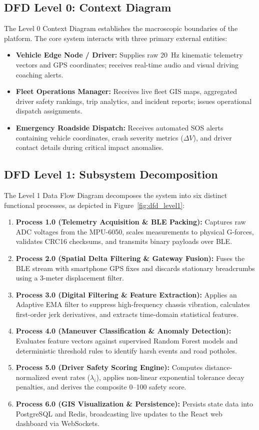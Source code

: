 \subsection{DFD Level 0: Context Diagram}
The Level 0 Context Diagram establishes the macroscopic boundaries of the platform. The core system interacts with three primary external entities:
\begin{itemize}
    \item \textbf{Vehicle Edge Node / Driver:} Supplies raw 20~Hz kinematic telemetry vectors and GPS coordinates; receives real-time audio and visual driving coaching alerts.
    \item \textbf{Fleet Operations Manager:} Receives live fleet GIS maps, aggregated driver safety rankings, trip analytics, and incident reports; issues operational dispatch assignments.
    \item \textbf{Emergency Roadside Dispatch:} Receives automated SOS alerts containing vehicle coordinates, crash severity metrics ($\Delta V$), and driver contact details during critical impact anomalies.
\end{itemize}

\subsection{DFD Level 1: Subsystem Decomposition}
The Level 1 Data Flow Diagram decomposes the system into six distinct functional processes, as depicted in Figure~\ref{fig:dfd_level1}:
\begin{enumerate}
    \item \textbf{Process 1.0 (Telemetry Acquisition \& BLE Packing):} Captures raw ADC voltages from the MPU-6050, scales measurements to physical G-forces, validates CRC16 checksums, and transmits binary payloads over BLE.
    \item \textbf{Process 2.0 (Spatial Delta Filtering \& Gateway Fusion):} Fuses the BLE stream with smartphone GPS fixes and discards stationary breadcrumbs using a 3-meter displacement filter.
    \item \textbf{Process 3.0 (Digital Filtering \& Feature Extraction):} Applies an Adaptive EMA filter to suppress high-frequency chassis vibration, calculates first-order jerk derivatives, and extracts time-domain statistical features.
    \item \textbf{Process 4.0 (Maneuver Classification \& Anomaly Detection):} Evaluates feature vectors against supervised Random Forest models and deterministic threshold rules to identify harsh events and road potholes.
    \item \textbf{Process 5.0 (Driver Safety Scoring Engine):} Computes distance-normalized event rates ($\lambda_i$), applies non-linear exponential tolerance decay penalties, and derives the composite 0--100 safety score.
    \item \textbf{Process 6.0 (GIS Visualization \& Persistence):} Persists state data into PostgreSQL and Redis, broadcasting live updates to the React web dashboard via WebSockets.
\end{enumerate}

